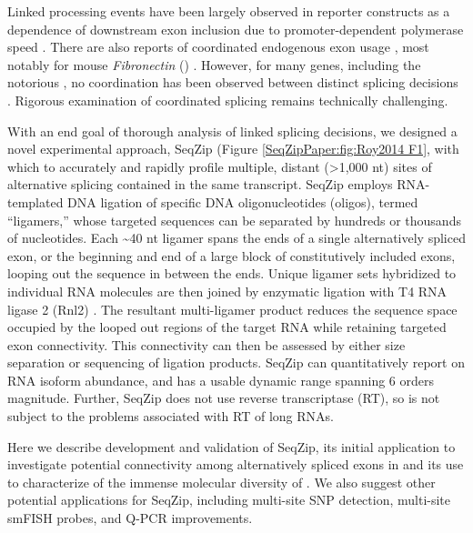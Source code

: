 	Linked processing events have been largely observed in reporter constructs as a dependence of downstream exon inclusion due to promoter-dependent polymerase speed \citep{Kornblihtt2013}. There are also reports of coordinated endogenous exon usage \citep{Fagnani2007}, most notably for mouse \textit{Fibronectin} (\fn{}) \citep{Fededa2005}. However, for many genes, including the notorious \flies{} \dscam{}, no coordination has been observed between distinct splicing decisions \citep{Miura2013b,Sun2013}. Rigorous examination of coordinated splicing remains technically challenging.

	With an end goal of thorough analysis of linked splicing decisions, we designed a novel experimental approach, SeqZip (Figure \ref{SeqZipPaper:fig:Roy2014 F1}, with which to accurately and rapidly profile multiple, distant (>1,000 nt) sites of alternative splicing contained in the same transcript. SeqZip employs RNA-templated DNA ligation of specific DNA oligonucleotides (oligos), termed ``ligamers,'' whose targeted sequences can be separated by hundreds or thousands of nucleotides. Each \textasciitilde 40 nt ligamer spans the ends of a single alternatively spliced exon, or the beginning and end of a large block of constitutively included exons, looping out the sequence in between the ends. Unique ligamer sets hybridized to individual RNA molecules are then joined by enzymatic ligation with T4 RNA ligase 2 (Rnl2) \citep{Ho2002b}. The resultant multi-ligamer product reduces the sequence space occupied by the looped out regions of the target RNA while retaining targeted exon connectivity. This connectivity can then be assessed by either size separation or sequencing of ligation products. SeqZip can quantitatively report on RNA isoform abundance, and has a usable dynamic range spanning 6 orders magnitude. Further, SeqZip does not use reverse transcriptase (RT), so is not subject to the problems associated with RT of long RNAs.

	Here we describe development and validation of SeqZip, its initial application to investigate potential connectivity among alternatively spliced exons in \fn{} and its use to characterize of the immense molecular diversity of \dscam{}. We also suggest other potential applications for SeqZip, including multi-site SNP detection, multi-site smFISH probes, and Q-PCR improvements.

